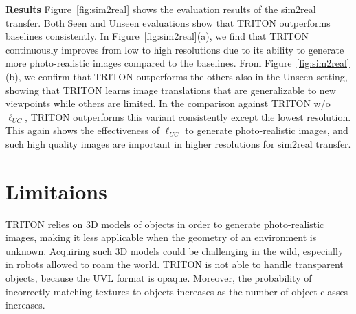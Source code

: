 \documentclass{article}
\begin{document}
\textbf{Results} Figure~\ref{fig:sim2real} shows the evaluation results of the sim2real transfer. Both Seen and Unseen evaluations show that TRITON outperforms baselines consistently. In Figure~\ref{fig:sim2real}(a), we find that TRITON continuously improves from low to high resolutions due to its ability to generate more photo-realistic images compared to the baselines.
From Figure~\ref{fig:sim2real}(b), we confirm that TRITON outperforms the others also in the Unseen setting, showing that TRITON learns image translations that are generalizable to new viewpoints while others are limited.
In the comparison against TRITON w/o $\ell_{UC}$, TRITON outperforms this variant consistently except the lowest resolution. This again shows the effectiveness of $\ell_{UC}$ to generate photo-realistic images, and such high quality images are important in higher resolutions for sim2real transfer.






\vspace{-8pt}
\section{Limitaions}
\label{sec:Limitations} 
TRITON relies on 3D models of objects in order to generate photo-realistic images, making it less applicable when the geometry of an environment is unknown. Acquiring such 3D models could be challenging in the wild, especially in robots allowed to roam the world. TRITON is not able to handle transparent objects, because the UVL format is opaque. Moreover, the probability of incorrectly matching textures to objects increases as the number of object classes increases.




\end{document}
